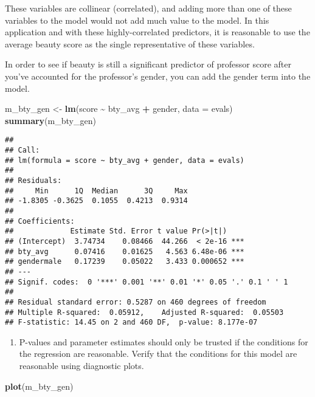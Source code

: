 \documentclass[
]{article}
\newenvironment{Shaded}{\begin{snugshade}}{\end{snugshade}}
\newcommand{\AttributeTok}[1]{\textcolor[rgb]{0.13,0.29,0.53}{#1}}
\newcommand{\FunctionTok}[1]{\textcolor[rgb]{0.13,0.29,0.53}{\textbf{#1}}}
\newcommand{\NormalTok}[1]{#1}
\newcommand{\OtherTok}[1]{\textcolor[rgb]{0.56,0.35,0.01}{#1}}
\newcommand{\SpecialCharTok}[1]{\textcolor[rgb]{0.81,0.36,0.00}{\textbf{#1}}}
\providecommand{\tightlist}{%
  \setlength{\itemsep}{0pt}\setlength{\parskip}{0pt}}
\begin{document}
These variables are collinear (correlated), and adding more than one of
these variables to the model would not add much value to the model. In
this application and with these highly-correlated predictors, it is
reasonable to use the average beauty score as the single representative
of these variables.

In order to see if beauty is still a significant predictor of professor
score after you've accounted for the professor's gender, you can add the
gender term into the model.

\begin{Shaded}
\begin{Highlighting}[]
\NormalTok{m\_bty\_gen }\OtherTok{\textless{}{-}} \FunctionTok{lm}\NormalTok{(score }\SpecialCharTok{\textasciitilde{}}\NormalTok{ bty\_avg }\SpecialCharTok{+}\NormalTok{ gender, }\AttributeTok{data =}\NormalTok{ evals)}
\FunctionTok{summary}\NormalTok{(m\_bty\_gen)}
\end{Highlighting}
\end{Shaded}

\begin{verbatim}
## 
## Call:
## lm(formula = score ~ bty_avg + gender, data = evals)
## 
## Residuals:
##     Min      1Q  Median      3Q     Max 
## -1.8305 -0.3625  0.1055  0.4213  0.9314 
## 
## Coefficients:
##             Estimate Std. Error t value Pr(>|t|)    
## (Intercept)  3.74734    0.08466  44.266  < 2e-16 ***
## bty_avg      0.07416    0.01625   4.563 6.48e-06 ***
## gendermale   0.17239    0.05022   3.433 0.000652 ***
## ---
## Signif. codes:  0 '***' 0.001 '**' 0.01 '*' 0.05 '.' 0.1 ' ' 1
## 
## Residual standard error: 0.5287 on 460 degrees of freedom
## Multiple R-squared:  0.05912,    Adjusted R-squared:  0.05503 
## F-statistic: 14.45 on 2 and 460 DF,  p-value: 8.177e-07
\end{verbatim}

\begin{enumerate}
\def\labelenumi{\arabic{enumi}.}
\setcounter{enumi}{6}
\tightlist
\item
  P-values and parameter estimates should only be trusted if the
  conditions for the regression are reasonable. Verify that the
  conditions for this model are reasonable using diagnostic plots.
\end{enumerate}

\begin{Shaded}
\begin{Highlighting}[]
\FunctionTok{plot}\NormalTok{(m\_bty\_gen)}
\end{Highlighting}
\end{Shaded}
\end{document}
